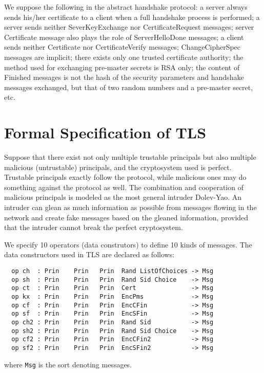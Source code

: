 \documentclass[a4paper,fleqn]{cas-dc}
\begin{document}
We suppose the following in the abstract handshake protocol: a server always sends his/her certificate to a client when a full handshake process is performed; a server sends neither SeverKeyExchange nor CertificateRequest messages; server Certificate message also plays the role of ServerHelloDone messages; a client sends neither Certificate nor CertificateVerify messages; ChangeCipherSpec messages are implicit; there exists only one trusted certificate authority; the method used for exchanging pre-master secrets is RSA only; the content of Finished messages is not the hash of the security parameters and handshake messages exchanged, but that of two random numbers and a pre-master secret, etc.

\section{Formal Specification of TLS} \label{fstls}
Suppose that there exist not only multiple trustable
principals but also multiple malicious (untrustable) principals, and the cryptosystem used is perfect. Trustable
principals exactly follow the protocol, while malicious ones may do something against the protocol as well. The combination and cooperation of malicious principals is modeled as the most general intruder Dolev-Yao\cite{dolev}. 
An intruder can glean as much information as possible from messages flowing in the network and create fake messages based on the gleaned information, provided that the intruder cannot break the perfect cryptosystem.

We specify 10 operators (data construtors) to define 10 kinds of messages. The data constructors used in TLS are declared as follows:
\begin{small}
		\begin{verbatim}
  op ch  : Prin    Prin   Prin  Rand ListOfChoices -> Msg
  op sh  : Prin    Prin   Prin  Rand Sid Choice    -> Msg
  op ct  : Prin    Prin   Prin  Cert               -> Msg
  op kx  : Prin    Prin   Prin  EncPms             -> Msg
  op cf  : Prin    Prin   Prin  EncCFin            -> Msg
  op sf  : Prin    Prin   Prin  EncSFin            -> Msg
  op ch2 : Prin    Prin   Prin  Rand Sid           -> Msg
  op sh2 : Prin    Prin   Prin  Rand Sid Choice    -> Msg
  op cf2 : Prin    Prin   Prin  EncCFin2           -> Msg
  op sf2 : Prin    Prin   Prin  EncSFin2           -> Msg
		\end{verbatim}
	\end{small}
where \verb!Msg! is the sort denoting messages. 
\end{document}
